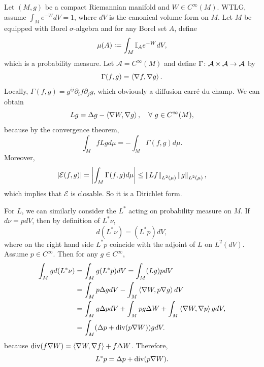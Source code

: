 Let $(M,g)$ be a compact Riemannian manifold and $W \in C^\infty(M)$. WTLG, assume $\int_M e^{-W} dV = 1$, where $dV$ is the canonical volume form on $M$. Let $M$ be equipped with Borel $\sigma$-algebra and for any Borel set $A$, define
\begin{equation*}
    \mu(A) \vcentcolon= \int_M \mathbb{I}_Ae^{-W}dV,
\end{equation*}
which is a probability measure. Let $\mathcal{A} = C^\infty(M)$ and define $\Gamma \colon \mathcal{A} \times \mathcal{A} \rightarrow \mathcal{A}$ by
\begin{equation*}
    \Gamma(f,g) = \left\langle \nabla f,\nabla g \right\rangle.
\end{equation*}
Locally, $\Gamma(f,g) = g^{ij}\partial_if \partial_j g$, which obviously a diffusion carr\'e du champ. We can obtain
\begin{equation*}
    Lg = \Delta g - \left\langle \nabla W,\nabla g \right\rangle,\quad \forall~ g \in C^\infty(M),
\end{equation*}
because by the convergence theorem,
\begin{equation*}
    \int_M f L g d \mu=-\int_M \Gamma(f, g) d \mu.
\end{equation*}
Moreover, 
\begin{equation*}
   \left\lvert\mathcal{E}(f,g)\right\lvert = \left\lvert\int_M \Gamma(f,g) d\mu\right\lvert \leq \left\lVert Lf\right\lVert_{L^2(\mu)}\left\lVert g\right\lVert_{L^2(\mu)},
\end{equation*}
which implies that $\mathcal{E}$ is closable. So it is a Dirichlet form.
\begin{rmk}
    For $L$, we can similarly consider the $L^*$ acting on probability measure on $M$. If $d\nu = pdV$, then by definition of $L^*\nu$,
    \begin{equation*}
        d(L^*\nu) = (L^*p)dV,
    \end{equation*}
    where on the right hand side $L^*p$ coincide with the adjoint of $L$ on $L^2(dV)$. Assume $p \in C^\infty$. Then for any $g \in C^\infty$,
    \begin{align*}
        \int_M gd(L^*\nu) &= \int_M g (L^*p) dV = \int_M (Lg)pdV \\
        &= \int_M p\Delta g dV - \int_M \left\langle \nabla W, p\nabla g \right\rangle dV\\
        &= \int_M g\Delta p dV + \int_M pg\Delta W + \int_M \left\langle \nabla W, \nabla p \right\rangle gdV,\\
        &= \int_M (\Delta p + \operatorname{div} (p \nabla W))gdV.
    \end{align*}
    because $\operatorname{div}(f\nabla W) = \left\langle \nabla W, \nabla f \right\rangle + f\Delta W$. Therefore,
    \begin{equation*}
        L^*p = \Delta p + \operatorname{div} (p \nabla W).
    \end{equation*}
\end{rmk}

